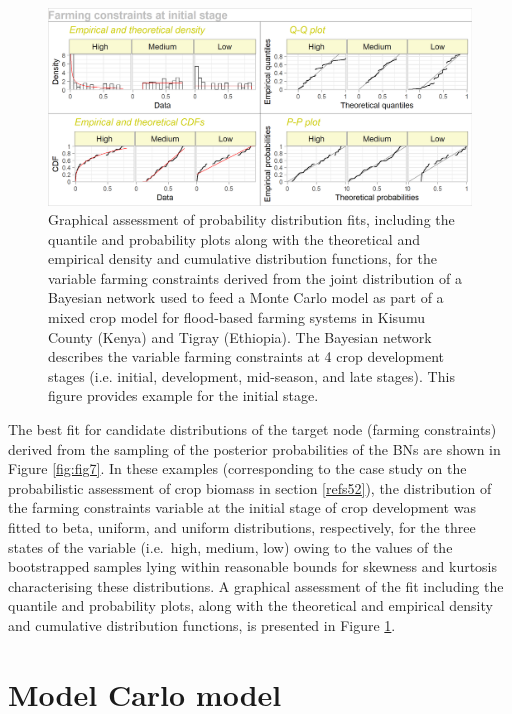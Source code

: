 \documentclass[]{elsarticle} %
\begin{document}
\begin{figure}[!h]

{\centering \includegraphics[width=1\linewidth,]{figures/figure_s8} 

}

\caption{Graphical assessment of probability distribution fits, including the quantile and probability plots along with the theoretical and empirical density and cumulative distribution functions, for the variable farming constraints derived from the joint distribution of a Bayesian network used to feed a Monte Carlo model as part of a mixed crop model for flood-based farming systems in Kisumu County (Kenya) and Tigray (Ethiopia). The Bayesian network describes the variable farming constraints at 4 crop development stages (i.e. initial, development, mid-season, and late stages). This figure provides example for the initial stage.}\label{fig:fig8}
\end{figure}

The best fit for candidate distributions of the target node (farming constraints) derived from the sampling of the posterior probabilities of the BNs are shown in Figure \ref{fig:fig7}. In these examples (corresponding to the case study on the probabilistic assessment of crop biomass in section \ref{refs52}), the distribution of the farming constraints variable at the initial stage of crop development was fitted to beta, uniform, and uniform distributions, respectively, for the three states of the variable (i.e.~high, medium, low) owing to the values of the bootstrapped samples lying within reasonable bounds for skewness and kurtosis characterising these distributions. A graphical assessment of the fit including the quantile and probability plots, along with the theoretical and empirical density and cumulative distribution functions, is presented in Figure \ref{fig:fig8}.

\hypertarget{refs4}{%
\section{Model Carlo model}\label{refs4}}
\end{document}
